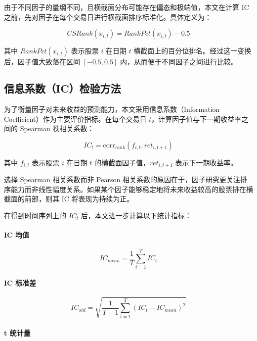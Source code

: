 \documentclass[a4paper,10pt]{article}
\begin{document}
由于不同因子的量纲不同，且横截面分布可能存在偏态和极端值，本文在计算 IC 之前，先对因子在每个交易日进行横截面排序标准化。具体定义为：

\begin{equation}
CSRank(x_{i,t}) = RankPct(x_{i,t}) - 0.5
\end{equation}

其中 $RankPct(x_{i,t})$ 表示股票 $i$ 在日期 $t$ 横截面上的百分位排名。经过这一变换后，因子值大致落在区间 $[-0.5,0.5]$ 内，从而便于不同因子之间进行比较。

\subsection{信息系数（IC）检验方法}

为了衡量因子对未来收益的预测能力，本文采用信息系数（Information Coefficient）作为主要评价指标。在每个交易日 $t$，计算因子值与下一期收益率之间的 Spearman 秩相关系数：

\begin{equation}
IC_t = \mathrm{corr}_{rank}(f_{i,t}, ret_{i,t+1})
\end{equation}

其中 $f_{i,t}$ 表示股票 $i$ 在日期 $t$ 的横截面因子值，$ret_{i,t+1}$ 表示下一期收益率。

选择 Spearman 相关系数而非 Pearson 相关系数的原因在于，因子研究更关注排序能力而非线性幅度关系。如果某个因子能够稳定地将未来收益较高的股票排在横截面的前部，则其 IC 将表现为持续为正。

在得到时间序列上的 $IC_t$ 后，本文进一步计算以下统计指标：

\paragraph{IC 均值}

\begin{equation}
IC_{mean} = \frac{1}{T} \sum_{t=1}^{T} IC_t
\end{equation}

\paragraph{IC 标准差}

\begin{equation}
IC_{std} = \sqrt{\frac{1}{T-1} \sum_{t=1}^{T} (IC_t - IC_{mean})^2}
\end{equation}

\paragraph{t 统计量}
\end{document}
